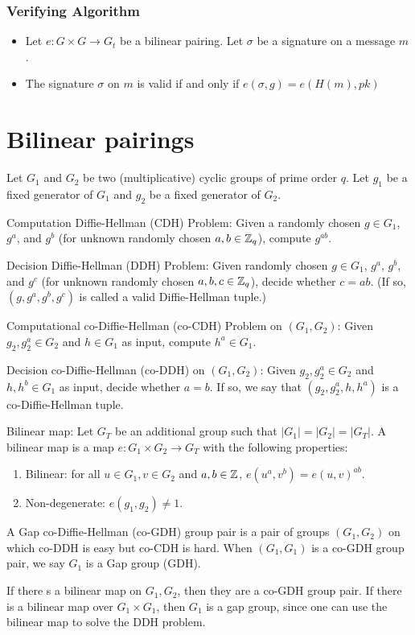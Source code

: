 \subsubsection*{Verifying Algorithm}
\begin{itemize}[align = left, leftmargin=*, label={--}]
\item Let $e: G \times G \rightarrow G_t$ be a bilinear pairing. Let $\sigma$ be a signature on a message $m$.
\item The signature $\sigma$ on $m$ is valid if and only if $e(\sigma, g) = e(H(m), pk)$
\end{itemize}

\section{Bilinear pairings}
\cite{DiHe76}

Let $G_1$ and $G_2$ be two (multiplicative) cyclic groups of prime order $q$. Let $g_1$ be a fixed generator of $G_1$ and $g_2$ be a fixed generator of $G_2$.

 Computation Diffie-Hellman (CDH) Problem: Given a randomly chosen $g \in G_1$, $g^a$, and $g^b$ (for unknown randomly chosen $a,b \in {\mathbb Z}_q$), compute $g^{ab}$.

 Decision Diffie-Hellman (DDH) Problem: Given randomly chosen $g \in G_1$, $g^a$, $g^b$, and $g^c$ (for unknown randomly chosen $a,b,c \in {\mathbb Z}_q$), decide whether $c = ab$. (If so, $(g, g^a, g^b, g^c)$ is called a valid Diffie-Hellman tuple.)

 Computational co-Diffie-Hellman (co-CDH) Problem on $(G_1, G_2)$: Given $g_2, g^a_2 \in G_2$ and $h \in G_1$ as input, compute $h^a \in G_1$.

 Decision co-Diffie-Hellman (co-DDH) on $(G_1, G_2)$: Given $g_2, g^a_2 \in G_2$ and $h, h^b \in G_1$ as input, decide whether $a=b$. If so, we say that $(g_2, g^a_2, h, h^a)$ is a co-Diffie-Hellman tuple.

 Bilinear map: Let $G_T$ be an additional group such that $ |G_1| = |G_2| = |G_T| $. A bilinear map is a map $e: G_1 \times G_2 \rightarrow G_T$ with the following properties:
\begin{enumerate}

\item Bilinear: for all $u \in G_1, v \in G_2$ and $a,b \in {\mathbb Z}$, $e(u^a, v^b) = e(u,v)^{ab}$.
\item Non-degenerate: $e(g_1, g_2) \neq 1$.

\end{enumerate}

 A Gap co-Diffie-Hellman (co-GDH) group pair is a pair of groups $(G_1, G_2)$ on which co-DDH is easy but co-CDH is hard. When $(G_1, G_1)$ is a co-GDH group pair, we say $G_1$ is a Gap group (GDH).

\remk If there s a bilinear map on $G_1, G_2$, then they are a co-GDH group pair. If there is a bilinear map over $G_1 \times G_1$, then $G_1$ is a gap group, since one can use the bilinear map to solve the DDH problem.